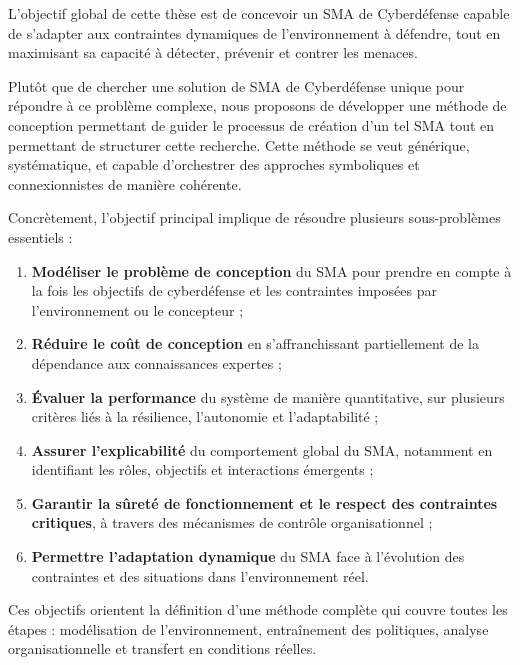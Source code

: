 L'objectif global de cette thèse est de concevoir un SMA de Cyberdéfense capable de s'adapter aux contraintes dynamiques de l'environnement à défendre, tout en maximisant sa capacité à détecter, prévenir et contrer les menaces.

Plutôt que de chercher une solution de SMA de Cyberdéfense unique pour répondre à ce problème complexe, nous proposons de développer une méthode de conception permettant de guider le processus de création d'un tel SMA tout en permettant de structurer cette recherche. Cette méthode se veut générique, systématique, et capable d'orchestrer des approches symboliques et connexionnistes de manière cohérente.

Concrètement, l'objectif principal implique de résoudre plusieurs sous-problèmes essentiels :
\begin{enumerate}
    \item \textbf{Modéliser le problème de conception} du SMA pour prendre en compte à la fois les objectifs de cyberdéfense et les contraintes imposées par l'environnement ou le concepteur ;
    \item \textbf{Réduire le coût de conception} en s'affranchissant partiellement de la dépendance aux connaissances expertes ;
    \item \textbf{Évaluer la performance} du système de manière quantitative, sur plusieurs critères liés à la résilience, l'autonomie et l'adaptabilité ;
    \item \textbf{Assurer l'explicabilité} du comportement global du SMA, notamment en identifiant les rôles, objectifs et interactions émergents ;
    \item \textbf{Garantir la sûreté de fonctionnement et le respect des contraintes critiques}, à travers des mécanismes de contrôle organisationnel ;
    \item \textbf{Permettre l'adaptation dynamique} du SMA face à l'évolution des contraintes et des situations dans l'environnement réel.
\end{enumerate}

Ces objectifs orientent la définition d'une méthode complète qui couvre toutes les étapes : modélisation de l'environnement, entraînement des politiques, analyse organisationnelle et transfert en conditions réelles.

\

\bigskip

\\

